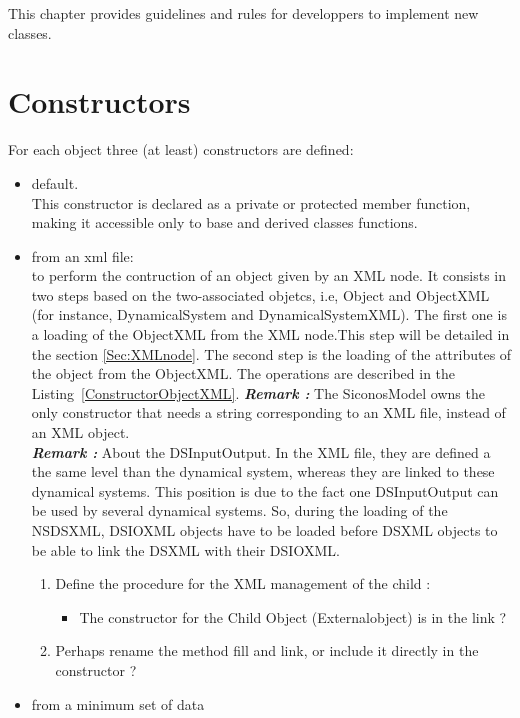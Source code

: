This chapter provides guidelines and rules for developpers to implement new classes. 

\section{Constructors}
For each object three (at least) constructors are defined: 
\begin{itemize}
\item default.\\
This constructor is declared as a private or protected member function, making it accessible only to base and derived classes functions. 
\item from an xml file:\\
  to perform  the contruction of an object given by an XML node. It consists in two steps based on the two-associated objetcs, i.e, Object and ObjectXML (for instance, DynamicalSystem and DynamicalSystemXML). The first one is a loading of the ObjectXML from the XML node.This step will be detailed in the section \ref{Sec:XMLnode}. The second  step is the loading of the attributes of the object from the ObjectXML. The operations are described in the Listing~\ref{ConstructorObjectXML}.
\textbf{\textit{Remark :}} The SiconosModel owns the only constructor that needs a string corresponding to an XML file, instead of an XML object.\\
\textbf{\textit{Remark :}} About the DSInputOutput. In the XML file, they are defined a the same level than the dynamical system, whereas they are linked to these dynamical systems. This position is due to the fact one DSInputOutput can be used by several dynamical systems. So, during the loading of the NSDSXML,  DSIOXML objects have to be loaded before DSXML objects to be able to link the DSXML with their DSIOXML.\\
 \begin{ndr}
   \begin{enumerate}
   \item Define the procedure for the XML management of the child :
     \begin{itemize}
     \item The constructor for the Child Object (Externalobject) is in the link ?
     \end{itemize}
   \item Perhaps rename the method fill and link, or include it directly in the constructor ?
   \end{enumerate}
 \end{ndr}
\item from a minimum set of data
\end{itemize}
